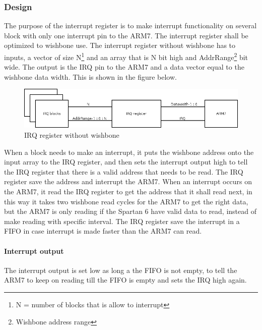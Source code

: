 \subsubsection{Design}
The purpose of the interrupt register is to make interrupt functionality on several block with only one interrupt pin to the ARM7. The interrupt register shall be optimized to wishbone use. The interrupt register without wishbone has to inputs, a vector of size N\footnote{N = number of blocks that is allow to interrupt} and an array that is N bit high and AddrRange\footnote{Wishbone address range} bit wide. The output is the IRQ pin to the ARM7 and a data vector equal to the wishbone data width. This is shown in the figure below.
\begin{figure}[H]
	\begin{centering}
		\includegraphics[width=1.0\textwidth]{images/tb5_irq_reg_nowb.png}
		\caption{IRQ register without wishbone}
	\end{centering}
\end{figure}
When a block needs to make an interrupt, it puts the wishbone address onto the input array to the IRQ register, and then sets the interrupt output high to tell the IRQ register that there is a valid address that needs to be read. The IRQ register save the address and interrupt the ARM7. When an interrupt occurs on the ARM7, it read the IRQ register to get the address that it shall read next, in this way it takes two wishbone read cycles for the ARM7 to get the right data, but the ARM7 is only reading if the Spartan 6 have valid data to read, instead of make reading with specific interval. The IRQ register save the interrupt in a FIFO in case interrupt is made faster than the ARM7 can read.\\
\paragraph{Interrupt output}
The interrupt output is set low as long a the FIFO is not empty, to tell the ARM7 to keep on reading till the FIFO is empty and sets the IRQ high again.

